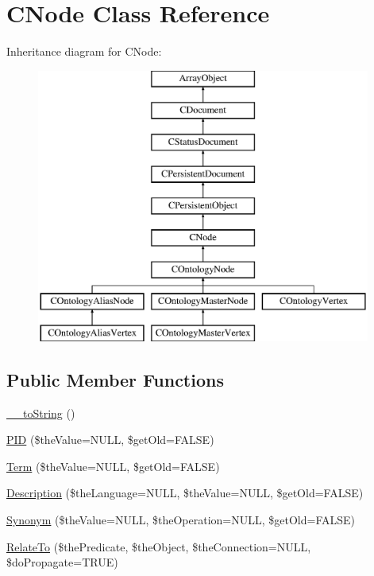\hypertarget{class_c_node}{\section{C\-Node Class Reference}
\label{class_c_node}
}
Inheritance diagram for C\-Node\-:\begin{figure}[H]
\begin{center}
\leavevmode
\includegraphics[height=9.000000cm]{class_c_node}
\end{center}
\end{figure}
\subsection*{Public Member Functions}
\begin{DoxyCompactItemize}
\item 
\hyperlink{class_c_node_adf7a1752d6bc7cd6d5cbc8f11d75c3f9}{\-\_\-\-\_\-to\-String} ()
\item 
\hyperlink{class_c_node_a3d2db41c8c96b7ac2d08ce7d2a36d4ea}{P\-I\-D} (\$the\-Value=N\-U\-L\-L, \$get\-Old=F\-A\-L\-S\-E)
\item 
\hyperlink{class_c_node_a885e13767f6df4c17ca2757b83f0d508}{Term} (\$the\-Value=N\-U\-L\-L, \$get\-Old=F\-A\-L\-S\-E)
\item 
\hyperlink{class_c_node_a5c1d1ac1bc2729951de092abaca3244f}{Description} (\$the\-Language=N\-U\-L\-L, \$the\-Value=N\-U\-L\-L, \$get\-Old=F\-A\-L\-S\-E)
\item 
\hyperlink{class_c_node_a864f2abf26ebac8a6a17ccf44d073f48}{Synonym} (\$the\-Value=N\-U\-L\-L, \$the\-Operation=N\-U\-L\-L, \$get\-Old=F\-A\-L\-S\-E)
\item 
\hyperlink{class_c_node_af2b8ddaa93259dac31fc34e4b70ef8ed}{Relate\-To} (\$the\-Predicate, \$the\-Object, \$the\-Connection=N\-U\-L\-L, \$do\-Propagate=T\-R\-U\-E)
\end{DoxyCompactItemize}
